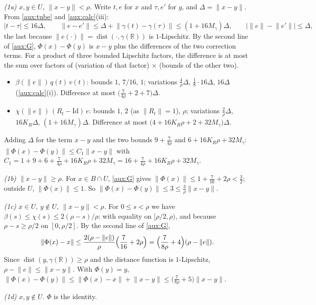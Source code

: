 \documentclass[11pt]{article}
\newcommand{\R}{\mathbb R}
\newcommand{\norm}[1]{\lVert #1\rVert}
\DeclareMathOperator{\dist}{dist}
\theoremstyle{definition}
\numberwithin{equation}{section}
\begin{document}
\emph{(1a) \(x,y\in U\), \(\norm{x-y}<\rho\).} Write \(t,e\) for \(x\) and
\(\tau,e'\) for \(y\), and \(\Delta=\norm{x-y}\). From \cref{aux:tube} and
\cref{aux:calc}(iii):
\[
 |t-\tau|\le16\Delta,\qquad
 \norm{e-e'}\le\Delta+\norm{\gamma(t)-\gamma(\tau)}\le(1+16M_\gamma)\Delta,
 \qquad\bigl|\norm e-\norm{e'}\bigr|\le\Delta,
\]
the last because \(\norm{e(\cdot)}=\dist(\cdot,\gamma(\R))\) is
\(1\)-Lipschitz. By the second line of \eqref{aux:G},
\(\Phi(x)-\Phi(y)\) is \(x-y\) plus the differences of the two correction
terms. For a product of three bounded Lipschitz factors, the difference is at
most the sum over factors of (variation of that factor) \(\times\) (bounds of
the other two).
\begin{itemize}
\item \(\beta(\norm e)\,q(t)\,v(t)\): bounds \(1\), \(7/16\), \(1\);
variations \(\frac4\rho\Delta\), \(\frac18\cdot16\Delta\), \(16\Delta\)
(\cref{aux:calc}(i)). Difference at most
\(\bigl(\frac{7}{4\rho}+2+7\bigr)\Delta\).
\item \(\chi(\norm e)\,(R_t-\mathrm{Id})\,e\): bounds \(1\), \(2\) (as
\(\norm{R_t}=1\)), \(\rho\); variations \(\frac2\rho\Delta\),
\(16K_R\Delta\), \((1+16M_\gamma)\Delta\). Difference at most
\(\bigl(4+16K_R\rho+2+32M_\gamma\bigr)\Delta\).
\end{itemize}
Adding \(\Delta\) for the term \(x-y\) and the two bounds \(9+\frac7{4\rho}\)
and \(6+16K_R\rho+32M_\gamma\):
\(\norm{\Phi(x)-\Phi(y)}\le C_1\norm{x-y}\) with
\(C_1=1+9+6+\frac7{4\rho}+16K_R\rho+32M_\gamma
=16+\frac7{4\rho}+16K_R\rho+32M_\gamma\).

\emph{(1b) \(\norm{x-y}\ge\rho\).} For \(x\in B\cap U\), \eqref{aux:G} gives
\(\norm{\Phi(x)}\le1+\frac7{16}+2\rho<\frac32\); outside \(U\),
\(\norm{\Phi(x)}\le1\). So
\(\norm{\Phi(x)-\Phi(y)}\le3\le\frac3\rho\norm{x-y}\).

\emph{(1c) \(x\in U\), \(y\notin U\), \(\norm{x-y}<\rho\).} For
\(0\le s<\rho\) we have \(\beta(s)\le\chi(s)\le2(\rho-s)/\rho\): with equality
on \([\rho/2,\rho)\), and because \(\rho-s\ge\rho/2\) on \([0,\rho/2]\). By
the second line of \eqref{aux:G},
\[
 \norm{\Phi(x)-x}\le\frac{2(\rho-\norm e)}{\rho}\Bigl(\frac7{16}+2\rho\Bigr)
 =\Bigl(\frac{7}{8\rho}+4\Bigr)(\rho-\norm e).
\]
Since \(\dist(y,\gamma(\R))\ge\rho\) and the distance function is
\(1\)-Lipschitz, \(\rho-\norm e\le\norm{x-y}\). With \(\Phi(y)=y\),
\(\norm{\Phi(x)-\Phi(y)}\le\norm{\Phi(x)-x}+\norm{x-y}
\le\bigl(\frac7{8\rho}+5\bigr)\norm{x-y}\).

\emph{(1d) \(x,y\notin U\).} \(\Phi\) is the identity.
\end{document}

